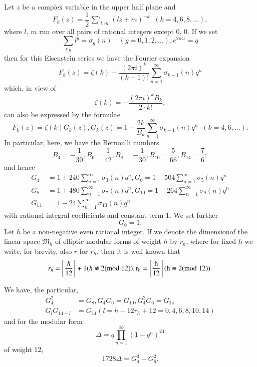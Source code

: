 Let $z$ be a complex variable in the upper half plane and 
\begin{equation*}
F_{k}(z)=\frac{1}{2}\mathop{{\sum}'}_{l,m}(lz+m)^{-k} \;\;
(k=4,6,8,\ldots),\tag{1}\label{app-eq1} 
\end{equation*}\pageoriginale
where $l$, $m$ run over all pairs of rational integers except $0$,
$0$. If we set
$$
\sum_{t|n}l^{g}=\sigma_{g}(n)\quad (g=0,1,2,\ldots), e^{2\pi iz}=q
$$
then for this Eisenstein series we have the Fourier expansion
\begin{equation*}
F_{k}(z)=\zeta(k)+\frac{(2\pi
  i)^{k}}{(k-1)!}\sum^{\infty}_{n=1}\sigma_{k-1}(n)q^{n}\tag{2}\label{app-eq2} 
\end{equation*}
which, in view of
\begin{equation*}
\zeta(k)=-\frac{(2\pi i)^{k}B_{k}}{2\cdot k!},\tag{3}\label{app-eq3}
\end{equation*}
can also be expressed by the formulae
\begin{equation*}
F_{k}(z)=\zeta(k)G_{k}(z),
G_{k}(z)=1-\frac{2k}{B_{k}}\sum^{\infty}_{n=1}\sigma_{k-1}(n)q^{n}
\;\; (k=4,6,\ldots).\tag{4}\label{app-eq4}
\end{equation*}
In particular, here, we have the Bernoulli numbers
$$
B_{4}=-\frac{1}{30},B_{6}=\frac{1}{42},B_{8}=-\frac{1}{30},B_{10}=\frac{5}{66},B_{14}=\frac{7}{6};
$$
and hence
\begin{align*}
G_{4} &= 1+240\sum^{\infty}_{n=1}\sigma_{3}(n)q^{n},
G_{6}=1-504\sum^{\infty}_{n=1}\sigma_{5}(n)q^{n}\\
G_{8} &= 1+480\sum^{\infty}_{n=1}\sigma_{7}(n)q^{n},
G_{10}=1-264\sum^{\infty}_{n=1}\sigma_{9}(n)q^{n}\tag{5}\label{app-eq5}\\
G_{14} &= 1-24\sum^{\infty}_{n=1}\sigma_{13}(n)q^{n}
\end{align*}
with rational integral coefficients and constant term $1$. We set
further
$$
G_{0}=1.
$$
Let $h$ be a non-negative even rational integer. If we denote the 
dimension\pageoriginale of the linear space $\mathfrak{M}_{h}$ of
elliptic modular forms of weight $h$ by $r_{h}$, where for fixed $h$
we write, for brevity, also $r$ for $r_{h}$, then it is well known
that
$$
r_{h}=\left[\frac{h}{12}\right]+1(h\not\equiv 2 (\rm{mod} \;  12)),
r_{h}=\left[\frac{h}{12}\right](h\equiv 2(\rm{mod} \;  12)).
$$

We have, the particular,
\begin{equation*}
\begin{split}
G^{2}_{4} &= G_{8}, G_{4}G_{6}=G_{10}, G^{2}_{4}G_{6}=G_{14}\\
G_{l}G_{14-l} &= G_{14}(l=h-12r_{h}+12=0,4,6,8,10,14)
\end{split}\tag{6}\label{app-eq6} 
\end{equation*}
and for the modular form
$$
\Delta=q\prod^{\infty}_{n=1}(1-q^{n})^{24}
$$
of weight 12,
$$
1728\Delta= G^{3}_{4}-G^{2}_{6}.
$$

